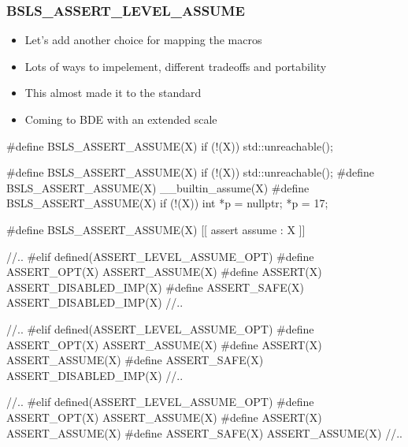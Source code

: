 \begin{frame}[fragile]
  \frametitle{BSLS_ASSERT_LEVEL_ASSUME}

  \begin{itemize}
  \item<1-> Let's add another choice for mapping the  macros
  \item<2-> Lots of ways to impelement, different tradeoffs and portability
  \item<3-> This almost made it to the standard
  \item<4-> Coming to BDE with an extended  scale
  \end{itemize}

  \begin{overprint}
\begin{cppcodebox}
#define BSLS_ASSERT_ASSUME(X) if (!(X)) { std::unreachable(); }
\end{cppcodebox}

\begin{cppcodebox}
#define BSLS_ASSERT_ASSUME(X) if (!(X)) { std::unreachable(); }
#define BSLS_ASSERT_ASSUME(X) __builtin_assume(X)
#define BSLS_ASSERT_ASSUME(X) if (!(X)) { int *p = nullptr; *p = 17; }
\end{cppcodebox}

\begin{cppcodebox}
#define BSLS_ASSERT_ASSUME(X) [[ assert assume : X ]]
\end{cppcodebox}

\begin{cppcodebox}
//..
#elif defined(ASSERT_LEVEL_ASSUME_OPT)
#define ASSERT_OPT(X)  ASSERT_ASSUME(X)
#define ASSERT(X)      ASSERT_DISABLED_IMP(X)
#define ASSERT_SAFE(X) ASSERT_DISABLED_IMP(X)
//..  
\end{cppcodebox}

\begin{cppcodebox}
//..
#elif defined(ASSERT_LEVEL_ASSUME_OPT)
#define ASSERT_OPT(X)  ASSERT_ASSUME(X)
#define ASSERT(X)      ASSERT_ASSUME(X)
#define ASSERT_SAFE(X) ASSERT_DISABLED_IMP(X)
//..  
\end{cppcodebox}

\begin{cppcodebox}
//..
#elif defined(ASSERT_LEVEL_ASSUME_OPT)
#define ASSERT_OPT(X)  ASSERT_ASSUME(X)
#define ASSERT(X)      ASSERT_ASSUME(X)
#define ASSERT_SAFE(X) ASSERT_ASSUME(X)
//..  
\end{cppcodebox}
\end{overprint}
  
\end{frame}
  


